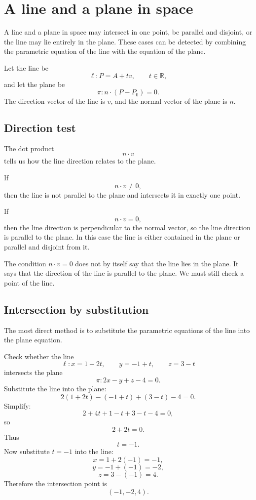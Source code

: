 \section{A line and a plane in space}

A line and a plane in space may intersect in one point, be parallel and disjoint, or the line may lie entirely in the plane. These cases can be detected by combining the parametric equation of the line with the equation of the plane.

Let the line be
\[
\ell:P=A+t v,
\qquad t\in\mathbb{R},
\]
and let the plane be
\[
\pi:n\cdot(P-P_0)=0.
\]
The direction vector of the line is \(v\), and the normal vector of the plane is \(n\).

\subsection*{Direction test}

The dot product
\[
n\cdot v
\]
tells us how the line direction relates to the plane.

If
\[
n\cdot v\ne0,
\]
then the line is not parallel to the plane and intersects it in exactly one point.

If
\[
n\cdot v=0,
\]
then the line direction is perpendicular to the normal vector, so the line direction is parallel to the plane. In this case the line is either contained in the plane or parallel and disjoint from it.

\begin{remarkbox}
The condition \(n\cdot v=0\) does not by itself say that the line lies in the plane. It says that the direction of the line is parallel to the plane. We must still check a point of the line.
\end{remarkbox}

\subsection*{Intersection by substitution}

The most direct method is to substitute the parametric equations of the line into the plane equation.

\begin{examplebox}
Check whether the line
\[
\ell:x=1+2t,\qquad y=-1+t,\qquad z=3-t
\]
intersects the plane
\[
\pi:2x-y+z-4=0.
\]
Substitute the line into the plane:
\[
2(1+2t)-(-1+t)+(3-t)-4=0.
\]
Simplify:
\[
2+4t+1-t+3-t-4=0,
\]
so
\[
2+2t=0.
\]
Thus
\[
t=-1.
\]
Now substitute \(t=-1\) into the line:
\[
x=1+2(-1)=-1,
\]
\[
y=-1+(-1)=-2,
\]
\[
z=3-(-1)=4.
\]
Therefore the intersection point is
\[
(-1,-2,4).
\]
\end{examplebox}

